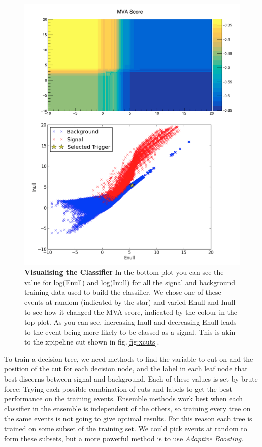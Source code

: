 \documentclass[12pt,twoside,a4paper]{report}
\begin{document}
\begin{figure} %
\begin{center}
\includegraphics[width=0.8\linewidth]{mva_trigger_and_score.png}
\end{center}
\caption{\textbf{Visualising the Classifier} In the bottom plot you can see the value for log(Enull) and log(Inull) for all the signal and background training data used to build the classifier. We chose one of these events at random (indicated by the star) and varied Enull and Inull to see how it changed the MVA score, indicated by the colour in the top plot. As you can see, increasing Inull and decreasing Enull leads to the event being more likely to be classed as a signal. This is akin to the xpipeline cut shown in fig.\ref{fig:xcuts}. }
\label{fig:mvacuts}
\end{figure}


To train a decision tree, we need methods to find the variable to cut on and the position of the cut for each decision node, and the label in each leaf node that best discerns between signal and background. Each of these values is set by brute force: Trying each possible combination of cuts and labels to get the best performance on the training events. Ensemble methods work best when each classifier in the ensemble is independent of the others, so training every tree on the same events is not going to give optimal results. For this reason each tree is trained on some subset of the training set.  We could pick events at random to form these subsets, but a more powerful method is to use \textit{Adaptive Boosting}. 
\end{document}
